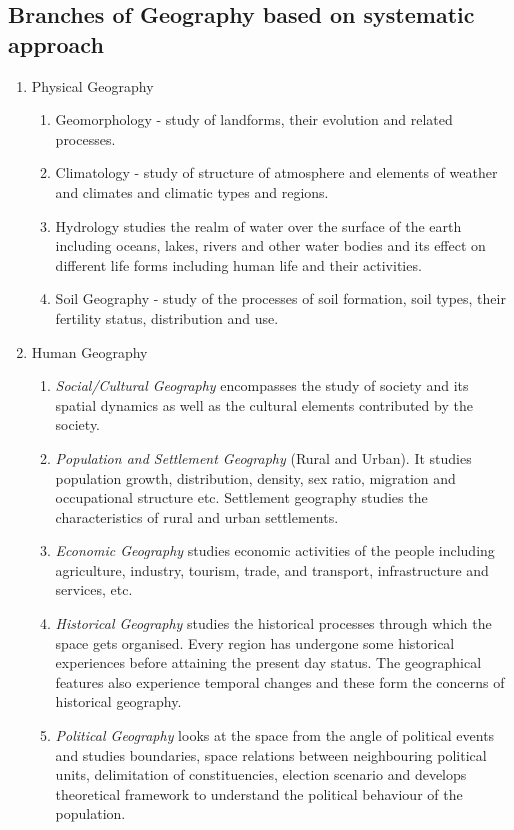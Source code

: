 \documentclass[8pt, a4paper, oneside, twocolumn]{extarticle}
\begin{document}
\subsection{Branches of Geography based on systematic approach}
\begin{enumerate}
  \item Physical Geography
  \begin{enumerate}
    \item Geomorphology - study of landforms, their evolution and related processes.
    \item Climatology - study of structure of atmosphere and elements of weather and climates and climatic types and regions.
    \item Hydrology studies the realm of water over the surface of the earth including oceans, lakes, rivers and other water bodies and its effect on different life forms including human life and their activities.
    \item Soil Geography - study of the processes of soil formation, soil types, their fertility status, distribution and use.
  \end{enumerate}
  \item Human Geography
  \begin{enumerate}
    \item \textit{Social/Cultural Geography} encompasses the study of society and its spatial dynamics as well as the cultural elements contributed by the society.
    \item \textit{Population and Settlement Geography} (Rural and Urban). It studies population growth, distribution, density, sex ratio, migration and occupational structure etc. Settlement geography studies the characteristics of rural and urban settlements.
    \item \textit{Economic Geography} studies economic activities of the people including agriculture, industry, tourism, trade, and transport, infrastructure and services, etc.
    \item \textit{Historical Geography} studies the historical processes through which the space gets organised. Every region has undergone some historical experiences before attaining the present day status. The geographical features also experience temporal changes and these form the concerns of historical geography.
    \item \textit{Political Geography} looks at the space from the angle of political events and studies boundaries, space relations between neighbouring political units, delimitation of constituencies, election scenario and develops theoretical framework to understand the political behaviour of the population.
    
  \end{enumerate}
\end{enumerate}
\end{document}
